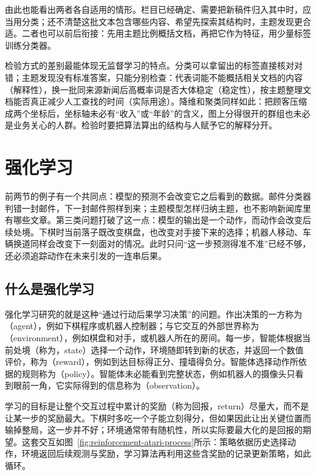 由此也能看出两者各自适用的情形。栏目已经确定、需要把新稿件归入其中时，应当用分类；还不清楚这批文本包含哪些内容、希望先探索其结构时，主题发现更合适。二者也可以前后衔接：先用主题比例概括文档，再把它作为特征，用少量标签训练分类器。

检验方式的差别最能体现无监督学习的特点。分类可以拿留出的标签直接核对对错；主题发现没有标准答案，只能分别检查：代表词能不能概括相关文档的内容（解释性），换一批同来源新闻后高概率词是否大体稳定（稳定性），按主题整理文档能否真正减少人工查找的时间（实际用途）。降维和聚类同样如此：把顾客压缩成两个坐标后，坐标轴未必有“收入”或“年龄”的含义，图上分得很开的群组也未必是业务关心的人群。检验时要把算法算出的结构与人赋予它的解释分开。

\FloatBarrier
\section{强化学习}
\label{sec:reinforcement-learning}

前两节的例子有一个共同点：模型的预测不会改变它之后看到的数据。邮件分类器判错一封邮件，下一封邮件照样到来；主题模型怎样归纳主题，也不影响新闻库里有哪些文章。第三类问题打破了这一点：模型的输出是一个动作，而动作会改变后续处境。下棋时当前落子既改变棋盘，也改变对手接下来的选择；机器人移动、车辆换道同样会改变下一刻面对的情况。此时只问“这一步预测得准不准”已经不够，还必须追踪动作在未来引发的一连串后果。

\subsection{什么是强化学习}

强化学习研究的就是这种“通过行动后果学习决策”的问题。作出决策的一方称为（agent），例如下棋程序或机器人控制器；与它交互的外部世界称为（environment），例如棋盘和对手，或机器人所在的房间。每一步，智能体根据当前处境（称为，state）选择一个动作，环境随即转到新的状态，并返回一个数值评价，称为（reward），例如到达目标得正分、撞墙得负分。智能体选择动作所依据的规则称为（policy）。智能体未必能看到完整状态，例如机器人的摄像头只看到眼前一角，它实际得到的信息称为（observation）。

学习的目标是让整个交互过程中累计的奖励（称为回报，return）尽量大，而不是让某一步的奖励最大。下棋时多吃一个子能立刻得分，但如果因此让出关键位置而输掉整局，这一步并不好；环境通常带有随机性，所以实际要最大化的是回报的期望。这套交互如图~\ref{fig:reinforcement-atari-process}所示：策略依据历史选择动作，环境返回后续观测与奖励，学习算法再利用这些含奖励的记录更新策略，如此循环。

